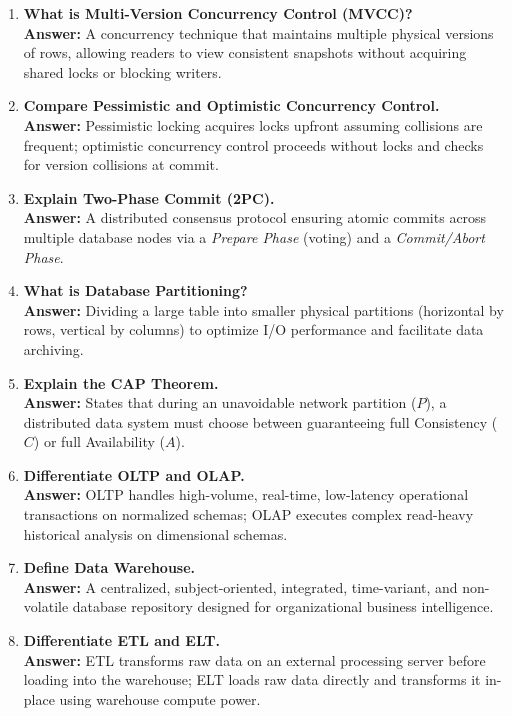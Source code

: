 \begin{enumerate}[label=\textbf{TB\arabic*.},leftmargin=1.2cm]
\item \textbf{What is Multi-Version Concurrency Control (MVCC)?} \\
\textbf{Answer:} A concurrency technique that maintains multiple physical versions of rows, allowing readers to view consistent snapshots without acquiring shared locks or blocking writers.

\item \textbf{Compare Pessimistic and Optimistic Concurrency Control.} \\
\textbf{Answer:} Pessimistic locking acquires locks upfront assuming collisions are frequent; optimistic concurrency control proceeds without locks and checks for version collisions at commit.

\item \textbf{Explain Two-Phase Commit (2PC).} \\
\textbf{Answer:} A distributed consensus protocol ensuring atomic commits across multiple database nodes via a \textit{Prepare Phase} (voting) and a \textit{Commit/Abort Phase}.

\item \textbf{What is Database Partitioning?} \\
\textbf{Answer:} Dividing a large table into smaller physical partitions (horizontal by rows, vertical by columns) to optimize I/O performance and facilitate data archiving.

\item \textbf{Explain the CAP Theorem.} \\
\textbf{Answer:} States that during an unavoidable network partition ($P$), a distributed data system must choose between guaranteeing full Consistency ($C$) or full Availability ($A$).

\item \textbf{Differentiate OLTP and OLAP.} \\
\textbf{Answer:} OLTP handles high-volume, real-time, low-latency operational transactions on normalized schemas; OLAP executes complex read-heavy historical analysis on dimensional schemas.

\item \textbf{Define Data Warehouse.} \\
\textbf{Answer:} A centralized, subject-oriented, integrated, time-variant, and non-volatile database repository designed for organizational business intelligence.

\item \textbf{Differentiate ETL and ELT.} \\
\textbf{Answer:} ETL transforms raw data on an external processing server before loading into the warehouse; ELT loads raw data directly and transforms it in-place using warehouse compute power.


\end{enumerate}

